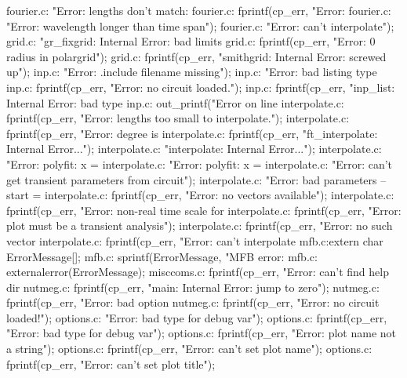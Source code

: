 {{{{{{fourier.c:                    "Error: lengths don't match: %
fourier.c:                fprintf(cp_err, "Error: %
fourier.c:                "Error: wavelength longer than time span\n");
fourier.c:                        "Error: can't interpolate\n");
grid.c:        "gr_fixgrid: Internal Error: bad limits %
grid.c:        fprintf(cp_err, "Error: 0 radius in polargrid\n");
grid.c:        fprintf(cp_err, "smithgrid: Internal Error: screwed up\n");
inp.c:                "Error: .include filename missing\n");
inp.c:                    "Error: bad listing type %
inp.c:        fprintf(cp_err, "Error: no circuit loaded.\n");
inp.c:        fprintf(cp_err, "inp_list: Internal Error: bad type %
inp.c:            out_printf("Error on line %
interpolate.c:        fprintf(cp_err, "Error: lengths too small to interpolate.\n");
interpolate.c:        fprintf(cp_err, "Error: degree is %
interpolate.c:            fprintf(cp_err, "ft_interpolate: Internal Error...\n");
interpolate.c:                    "interpolate: Internal Error...\n");
interpolate.c:                "Error: polyfit: x = %
interpolate.c:                "Error: polyfit: x = %
interpolate.c:            "Error: can't get transient parameters from circuit\n");
interpolate.c:         "Error: bad parameters -- start = %
interpolate.c:        fprintf(cp_err, "Error: no vectors available\n");
interpolate.c:        fprintf(cp_err, "Error: non-real time scale for %
interpolate.c:        fprintf(cp_err, "Error: plot must be a transient analysis\n");
interpolate.c:                fprintf(cp_err, "Error: no such vector %
interpolate.c:        fprintf(cp_err, "Error: can't interpolate %
mfb.c:extern char ErrorMessage[];
mfb.c:      sprintf(ErrorMessage, "MFB error: %
mfb.c:      externalerror(ErrorMessage);
misccoms.c:        fprintf(cp_err, "Error: can't find help dir %
nutmeg.c:        fprintf(cp_err, "main: Internal Error: jump to zero\n");
nutmeg.c:                fprintf(cp_err, "Error: bad option %
nutmeg.c:                fprintf(cp_err, "Error: no circuit loaded!\n");
options.c:                    "Error: bad type for debug var\n");
options.c:            fprintf(cp_err, "Error: bad type for debug var\n");
options.c:            fprintf(cp_err, "Error: plot name not a string\n");
options.c:            fprintf(cp_err, "Error: can't set plot name\n");
options.c:            fprintf(cp_err, "Error: can't set plot title\n");
}}}}}}
